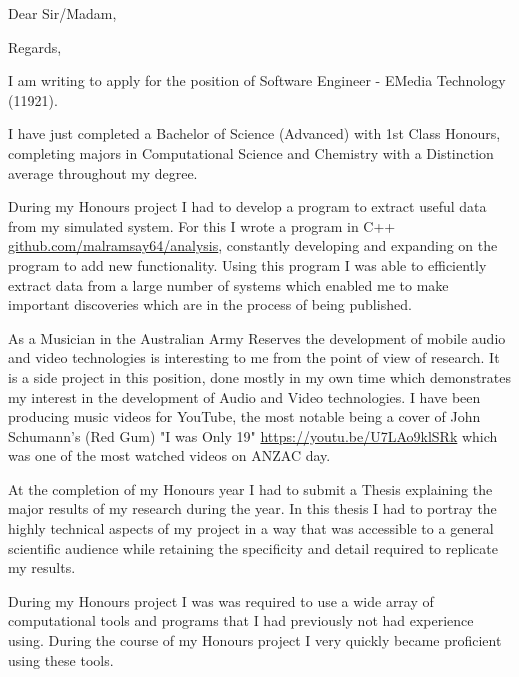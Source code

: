 


\recipient{~}{~}
\date{\today}
\opening{Dear Sir/Madam,}
\closing{Regards,}



\makelettertitle

I am writing to apply for the position of Software Engineer - EMedia Technology (11921). 


I have just completed a Bachelor of Science (Advanced) with 1st Class Honours, completing majors in Computational Science and Chemistry with a Distinction average throughout my degree.


During my Honours project I had to develop a program to extract useful data from my simulated system. For this I wrote a program in C++ \url{github.com/malramsay64/analysis}, constantly developing and expanding on the program to add new functionality. Using this program I was able to efficiently extract data from a large number of systems which enabled me to make important discoveries which are in the process of being published.


As a Musician in the Australian Army Reserves the development of mobile audio and video technologies is interesting to me from the point of view of research. It is a side project in this position, done mostly in my own time which demonstrates my interest in the development of Audio and Video technologies. I have been producing music videos for YouTube, the most notable being a cover of John Schumann's (Red Gum) "I was Only 19" \url{https://youtu.be/U7LAo9klSRk} which was one of the most watched videos on ANZAC day.


At the completion of my Honours year I had to submit a Thesis explaining the major results of my research during the year. In this thesis I had to portray the highly technical aspects of my project in a way that was accessible to a general scientific audience while retaining the specificity and detail required to replicate my results.


During my Honours project I was was required to use a wide array of computational tools and programs that I had previously not had experience using. During the course of my Honours project I very quickly became proficient using these tools.


\makeletterclosing


